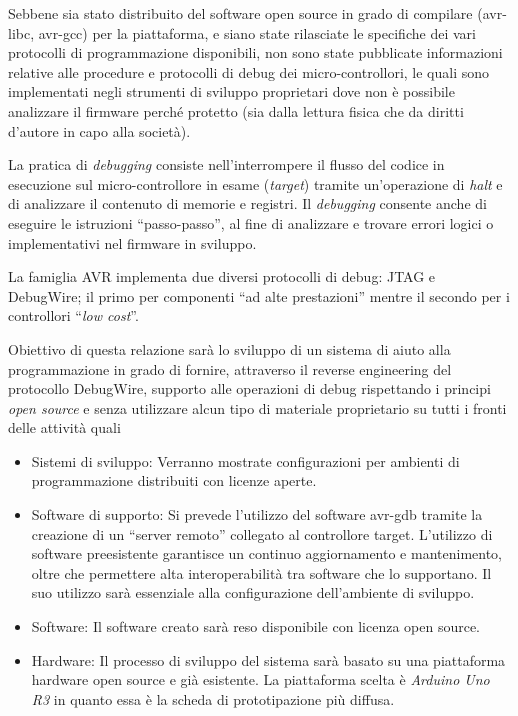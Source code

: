 Sebbene sia stato distribuito del software open source in grado di compilare (avr-libc\cite{site:avr-libc}, avr-gcc\cite{site:avr-gcc}) per la piattaforma, e siano state rilasciate le specifiche dei vari protocolli di programmazione disponibili\cite{avr:appnote:isp}\cite{avr:appnote:tpi}\cite{avr:appnote:pdi}, non sono state pubblicate informazioni relative alle procedure e protocolli di debug dei micro-controllori, le quali sono implementati negli strumenti di sviluppo proprietari dove non è possibile analizzare il firmware perché protetto (sia dalla lettura fisica che da diritti d'autore in capo alla società).

La pratica di \textit{debugging} consiste nell'interrompere il flusso del codice in esecuzione sul micro-controllore in esame (\textit{target}) tramite un'operazione di \textit{halt} e di analizzare il contenuto di memorie e registri. Il \textit{debugging} consente anche di eseguire le istruzioni ``passo-passo'', al fine di analizzare e trovare errori logici o implementativi nel firmware in sviluppo.

La famiglia AVR implementa due diversi protocolli di debug: JTAG e DebugWire; il primo per componenti ``ad alte prestazioni'' mentre il secondo per i controllori ``\textit{low cost}''.

Obiettivo di questa relazione sarà lo sviluppo di un sistema di aiuto alla programmazione in grado di fornire, attraverso il reverse engineering del protocollo DebugWire\cite{site:dw-reverse-engeneering}, supporto alle operazioni di debug rispettando i principi \textit{open source} e senza utilizzare alcun tipo di materiale proprietario su tutti i fronti delle attività quali 
\begin{itemize}
    \item Sistemi di sviluppo: Verranno mostrate configurazioni per ambienti di programmazione distribuiti con licenze aperte. 
    \item Software di supporto: Si prevede l'utilizzo del software avr-gdb\cite{site:gdb} tramite la creazione di un ``server remoto'' collegato al controllore target. L'utilizzo di software preesistente garantisce un continuo aggiornamento e mantenimento, oltre che permettere alta interoperabilità tra software che lo supportano. Il suo utilizzo sarà essenziale alla configurazione dell'ambiente di sviluppo.
    \item Software: Il software creato sarà reso disponibile con licenza open source.
    \item Hardware: Il processo di sviluppo del sistema sarà basato su una piattaforma hardware open source e già esistente. La piattaforma scelta è \textit{Arduino Uno R3} in quanto essa è la scheda di prototipazione più diffusa.
\end{itemize}

